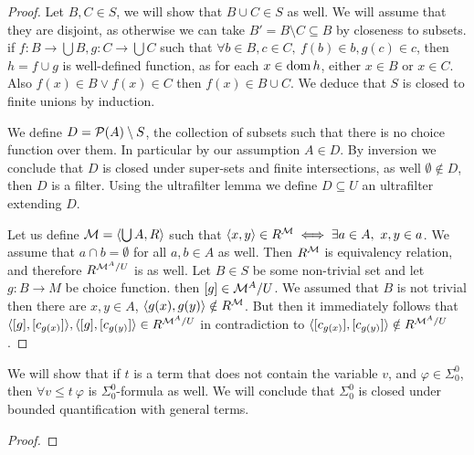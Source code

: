 \begin{proof}
	Let $B, C \in S$, we will show that $B \cup C \in S$ as well.
	We will assume that they are disjoint, as otherwise we can take $B' = B \setminus C \subseteq B$ by closeness to subsets.
	if $f : B \to \bigcup B, g : C \to \bigcup C$ such that $\forall b \in B, c \in C,\ f(b) \in b, g(c) \in c$, then $h = f \cup g$ is well-defined function,
	as for each $x \in \operatorname{dom} h$, either $x \in B$ or $x \in C$.
	Also $f(x) \in B \lor f(x) \in C$ then $f(x) \in B \cup C$.
	We deduce that $S$ is closed to finite unions by induction.

	We define $D = \mathcal{P}(A) \setminus S$, the collection of subsets such that there is no choice function over them. In particular by our assumption $A \in D$.
	By inversion we conclude that $D$ is closed under super-sets and finite intersections, as well $\emptyset \notin D$, then $D$ is a filter.
	Using the ultrafilter lemma we define $D \subseteq U$ an ultrafilter extending $D$.

	Let us define $\mathcal{M} = \langle \bigcup A, R \rangle$ such that $\langle x, y \rangle \in R^{\mathcal{M}} \iff \exists a \in A,\ x, y \in a$.
	We assume that $a \cap b = \emptyset$ for all $a, b \in A$ as well.
	Then $R^{\mathcal{M}}$ is equivalency relation, and therefore $R^{\mathcal{M}^A / U}$ is as well.
	Let $B \in S$ be some non-trivial set and let $g : B \to M$ be choice function.
	then $[g] \in \mathcal{M}^A / U$.
	We assumed that $B$ is not trivial then there are $x, y \in A$, $\langle g(x), g(y) \rangle \notin R^{\mathcal{M}}$.
	But then it immediately follows that $\langle [g], [c_{g(x)}] \rangle, \langle [g], [c_{g(y)}] \rangle \in R^{\mathcal{M}^A / U}$ in contradiction to $\langle [c_{g(x)}], [c_{g(y)}] \rangle \notin R^{\mathcal{M}^A / U}$.
\end{proof}

\question{}
We will show that if $t$ is a term that does not contain the variable $v$, and $\varphi \in \Sigma_0^0$,
then $\forall v \le t\ \varphi$ is $\Sigma_0^0$-formula as well.
We will conclude that $\Sigma_0^0$ is closed under bounded quantification with general terms.
\begin{proof}
	
\end{proof}

